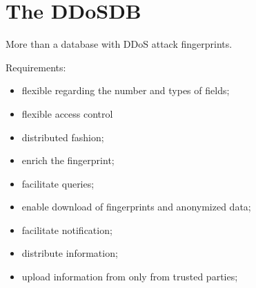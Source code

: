 \section{The DDoSDB}
\label{sec:ddosdb}

More than a database with DDoS attack fingerprints.


Requirements:
\begin{itemize}
	\item flexible regarding the number and types of fields; 
	\item flexible access control
	\item distributed fashion;
	\item enrich the fingerprint;
	\item facilitate queries;
	\item enable download of fingerprints and anonymized data;
	\item facilitate notification;
	\item distribute information;
	\item upload information from only from trusted parties;
\end{itemize}